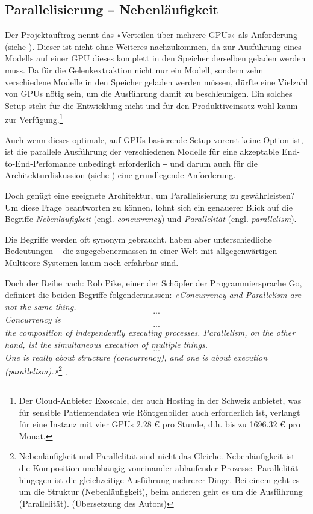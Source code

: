 \subsection{Parallelisierung ‒ Nebenläufigkeit}

Der Projektauftrag nennt das «Verteilen über mehrere GPUs» als Anforderung (siehe ). Dieser ist nicht ohne Weiteres nachzukommen, da zur Ausführung eines Modells auf einer GPU dieses komplett in den Speicher derselben geladen werden muss. Da für die Gelenkextraktion nicht nur ein Modell, sondern zehn verschiedene Modelle in den Speicher geladen werden müssen, dürfte eine Vielzahl von GPUs nötig sein, um die Ausführung damit zu beschleunigen. Ein solches Setup steht für die Entwicklung nicht und für den Produktiveinsatz wohl kaum zur Verfügung.\footnote{Der Cloud-Anbieter Exoscale, der auch Hosting in der Schweiz anbietet, was für sensible Patientendaten wie Röntgenbilder auch erforderlich ist, verlangt für eine Instanz mit vier GPUs 2.28 € pro Stunde, d.h. bis zu 1696.32 € pro Monat.}

Auch wenn dieses optimale, auf GPUs basierende Setup vorerst keine Option ist, ist die parallele Ausführung der verschiedenen Modelle für eine akzeptable End-to-End-Perfomance unbedingt erforderlich ‒ und darum auch für die Architekturdiskussion (siehe ) eine grundlegende Anforderung.

Doch genügt eine geeignete Architektur, um Parallelisierung zu gewährleisten? Um diese Frage beantworten zu können, lohnt sich ein genauerer Blick auf die Begriffe \textit{Nebenläufigkeit} (engl. \textit{concurrency}) und \textit{Parallelität} (engl. \textit{parallelism}).

Die Begriffe werden oft synonym gebraucht, haben aber unterschiedliche Bedeutungen ‒ die zugegebenermassen in einer Welt mit allgegenwärtigen Multicore-Systemen kaum noch erfahrbar sind.

Doch der Reihe nach: Rob Pike, einer der Schöpfer der Programmiersprache Go, definiert die beiden Begriffe folgendermassen: \textit{«Concurrency and Parallelism are not the same thing. \[...\] Concurrency is \[...\] the composition of independently executing processes. Parallelism, on the other hand, ist the simultaneous execution of multiple things. \[...\] One is really about structure (concurrency), and one is about execution (parallelism).»}\footnote{Nebenläufigkeit und Parallelität sind nicht das Gleiche. Nebenläufigkeit ist die Komposition unabhängig voneinander ablaufender Prozesse. Parallelität hingegen ist die gleichzeitige Ausführung mehrerer Dinge. Bei einem geht es um die Struktur (Nebenläufigkeit), beim anderen geht es um die Ausführung (Parallelität). (Übersetzung des Autors)} \cite[ab 1:16]{concurrency-is-not-parallelism}.

